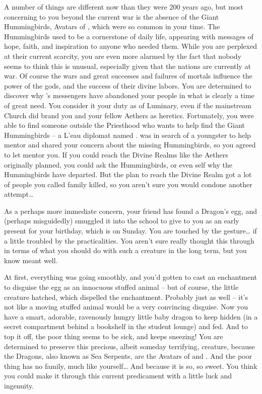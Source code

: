 \documentclass[char]{GL2020}
\begin{document}
A number of things are different now than they were 200 years ago, but most concerning to you beyond the current war is the absence of the Giant Hummingbirds, Avatars of \cFarmGod{}, which were so common in your time. The Hummingbirds used to be a cornerstone of daily life, appearing with messages of hope, faith, and inspiration to anyone who needed them. While you are perplexed at their current scarcity, you are even more alarmed by the fact that nobody seems to think this is unusual, especially given that the nations are currently at war. Of course the wars and great successes and failures of mortals influence the power of the gods, and the success of their divine labors. You are determined to discover why \cFarmGod{}'s messengers have abandoned your people in what is clearly a time of great need. You consider it your duty as \cDisney{\cleric} of Luminary, even if the mainstream Church did brand you and your fellow Aethers as heretics. Fortunately, you were able to find someone outside the Priesthood who wants to help find the Giant Hummingbirds – a L'eau diplomat named \cJuniorStatesman{}. \cJuniorStatesman{\they} was in search of a youngster to help mentor and shared your concern about the missing Hummingbirds, so you agreed to let \cJuniorStatesman{\them} mentor you. If you could reach the Divine Realms like the Aethers originally planned, you could  ask the Hummingbirds, or even \cFarmGod{} \cFarmGod{\them}self why the Hummingbirds have departed. But the plan to reach the Divine Realm got a lot of people you called family killed, so you aren't sure you would condone another attempt\ldots{}
 
As a perhaps more immediate concern, your friend \cPirateChild{} has found a Dragon's egg, and (perhaps misguidedly) smuggled it into the school to give to you as an early present for your birthday, which is on Sunday. You are touched by the gesture\ldots{} if a little troubled by the practicalities. You aren't sure \cPirateChild{} really thought this through in terms of what you should do with such a creature in the long term, but you know \cPirateChild{\they} meant well. 

At first, everything was going smoothly, and you'd gotten \cAdopted{} to cast an enchantment to disguise the egg as an innocuous stuffed animal – but of course, the little creature hatched, which dispelled the enchantment. Probably just as well – it's not like a moving stuffed animal would be a very convincing disguise. Now you have a smart, adorable, ravenously hungry little baby dragon to keep hidden (in a secret compartment behind a bookshelf in the student lounge) and fed. And to top it off, the poor thing seems to be sick, and keeps sneezing! You are determined to preserve this precious, albeit someday terrifying, creature, because the Dragons, also known as Sea Serpents, are the Avatars of \cEbbFull{} and \cFlowFull{}. And the poor thing has no family, much like yourself\ldots{} And because it is so, so sweet. You think you could make it through this current predicament with a little luck and ingenuity.
\end{document}
